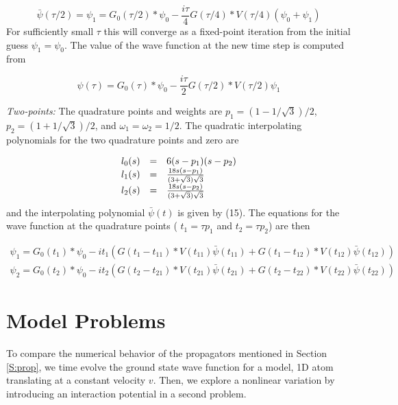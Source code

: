 \documentclass[review,letterpaper]{elsarticle}
\begin{document}
\begin{equation}
\bar{\psi }(\tau /2)=\psi _{1}=G_{0}(\tau /2)\ast \psi _{0}-\frac{i\tau }{4}G(\tau /4)\ast V(\tau /4)(\psi _{0}+\psi _{1})
\end{equation}
For sufficiently small  $\tau $ this will converge as a fixed-point iteration from the initial guess
$\psi _{1}=\psi _{0}$. The value of the wave function at the new time step is computed from

\begin{equation}
\psi (\tau )=G_{0}(\tau )\ast \psi _{0}-\frac{i\tau }{2}G(\tau /2)\ast V(\tau /2)\psi _{1}
\end{equation}



\textit{Two-points:} The quadrature points and weights are  $p_{1}=(1-1/\sqrt{3})/2$,
$p_{2}=(1+1/\sqrt{3})/2$, and  $\omega _{1}=\omega _{2}=1/2$. The quadratic interpolating
polynomials for the two quadrature points and zero are

\begin{equation}
\begin{matrix}l_{0}(s)&\text{=}&6(s-p_{1})(s-p_{2})\hfill\null \\l_{1}(s)&\text{=}&\frac{18s(s-p_{1})}{(3+\sqrt{3})\sqrt{3}}\hfill\null \\l_{2}(s)&\text{=}&\frac{18s(s-p_{2})}{(3+\sqrt{3})\sqrt{3}}\hfill\null \end{matrix}
\end{equation}
and the interpolating polynomial  $\bar{\psi }(t)$ is given by (15). The equations for the wave function at the quadrature points ( $t_{1}=\tau p_{1}$ and  $t_{2}=\tau p_{2}$) are then

\begin{equation}
\begin{gathered}\psi _{1}=G_{0}(t_{1})\ast \psi _{0}-it_{1}\left(G(t_{1}-t_{11})\ast V(t_{11})\bar{\psi }(t_{11})+G(t_{1}-t_{12})\ast V(t_{12})\bar{\psi }(t_{12})\right)\\\psi _{2}=G_{0}(t_{2})\ast \psi _{0}-it_{2}\left(G(t_{2}-t_{21})\ast V(t_{21})\bar{\psi }(t_{21})+G(t_{2}-t_{22})\ast V(t_{22})\bar{\psi }(t_{22})\right)\end{gathered}
\end{equation}



\section{Model Problems}
\label{S:modelProblems}
To compare the numerical behavior of the propagators mentioned in Section \ref{S:prop}, we time evolve
the ground state wave function for a model, 1D atom translating at a constant velocity  $v$.
Then, we explore a nonlinear variation by introducing an interaction potential in a second problem.
\end{document}
